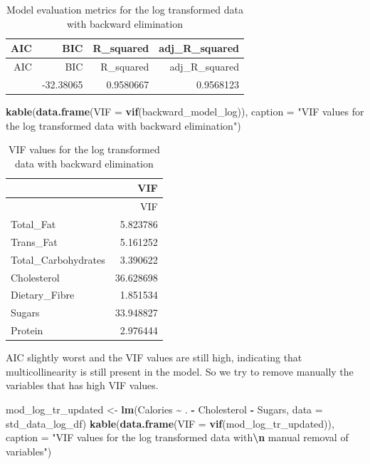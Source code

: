 \documentclass[
]{article}
\newenvironment{Shaded}{\begin{snugshade}}{\end{snugshade}}
\newcommand{\AttributeTok}[1]{\textcolor[rgb]{0.13,0.29,0.53}{#1}}
\newcommand{\FunctionTok}[1]{\textcolor[rgb]{0.13,0.29,0.53}{\textbf{#1}}}
\newcommand{\NormalTok}[1]{#1}
\newcommand{\OtherTok}[1]{\textcolor[rgb]{0.56,0.35,0.01}{#1}}
\newcommand{\SpecialCharTok}[1]{\textcolor[rgb]{0.81,0.36,0.00}{\textbf{#1}}}
\newcommand{\StringTok}[1]{\textcolor[rgb]{0.31,0.60,0.02}{#1}}
\begin{document}
\begin{longtable}[]{@{}rrrr@{}}
\caption{Model evaluation metrics for the log transformed data with
backward elimination}\tabularnewline
\toprule\noalign{}
AIC & BIC & R\_squared & adj\_R\_squared \\
\midrule\noalign{}
\endfirsthead
\toprule\noalign{}
AIC & BIC & R\_squared & adj\_R\_squared \\
\midrule\noalign{}
\endhead
\bottomrule\noalign{}
\endlastfoot
-63.78109 & -32.38065 & 0.9580667 & 0.9568123 \\
\end{longtable}

\begin{Shaded}
\begin{Highlighting}[]
\FunctionTok{kable}\NormalTok{(}\FunctionTok{data.frame}\NormalTok{(}\AttributeTok{VIF =} \FunctionTok{vif}\NormalTok{(backward\_model\_log)),}
      \AttributeTok{caption =} \StringTok{"VIF values for the log transformed data with backward elimination"}\NormalTok{)}
\end{Highlighting}
\end{Shaded}

\begin{longtable}[]{@{}lr@{}}
\caption{VIF values for the log transformed data with backward
elimination}\tabularnewline
\toprule\noalign{}
& VIF \\
\midrule\noalign{}
\endfirsthead
\toprule\noalign{}
& VIF \\
\midrule\noalign{}
\endhead
\bottomrule\noalign{}
\endlastfoot
Total\_Fat & 5.823786 \\
Trans\_Fat & 5.161252 \\
Total\_Carbohydrates & 3.390622 \\
Cholesterol & 36.628698 \\
Dietary\_Fibre & 1.851534 \\
Sugars & 33.948827 \\
Protein & 2.976444 \\
\end{longtable}

AIC slightly worst and the VIF values are still high, indicating that
multicollinearity is still present in the model. So we try to remove
manually the variables that has high VIF values.

\begin{Shaded}
\begin{Highlighting}[]
\NormalTok{mod\_log\_tr\_updated }\OtherTok{\textless{}{-}} \FunctionTok{lm}\NormalTok{(Calories }\SpecialCharTok{\textasciitilde{}}\NormalTok{ . }\SpecialCharTok{{-}}\NormalTok{ Cholesterol }\SpecialCharTok{{-}}\NormalTok{ Sugars,}
                         \AttributeTok{data =}\NormalTok{ std\_data\_log\_df)}
\FunctionTok{kable}\NormalTok{(}\FunctionTok{data.frame}\NormalTok{(}\AttributeTok{VIF =} \FunctionTok{vif}\NormalTok{(mod\_log\_tr\_updated)),}
      \AttributeTok{caption =} \StringTok{"VIF values for the log transformed data with}\SpecialCharTok{\textbackslash{}n}
\StringTok{      manual removal of variables"}\NormalTok{)}
\end{Highlighting}
\end{Shaded}
\end{document}
